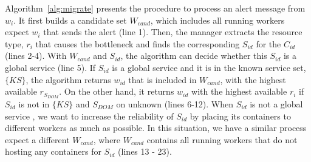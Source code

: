 Algorithm~\ref{alg:migrate} presents the procedure to process an alert message from $w_i$.
It first builds a candidate set $W_{cand}$, which includes all running workers expect $w_i$ that sends the alert (line 1).
Then, the manager extracts the resource type, $r_i$ that causes the bottleneck and finds the corresponding $S_{id}$ for the $C_{id}$ (lines 2-4).
With $W_{cand}$ and $S_{id}$, the algorithm can decide whether this $S_{id}$ is a global service (line 5). 
If $S_{id}$ is a global service and it is in the known service set, $\{KS\}$, the algorithm returns $w_{id}$ that is included in $W_{cand}$,
with the highest available $r_{S_{DOM}}$.
On the other hand, it returns $w_{id}$ with the highest available $r_i$ if $S_{id}$ is not in $\{KS\}$ and $S_{DOM}$ on unknown (lines 6-12).
When $S_{id}$ is not a global service , we want to increase the reliability of $S_{id}$ by placing its containers to different workers as much as possible.
In this situation, we have a similar process expect a different $W_{cand}$, where $W_{cand}$  contains all running
workers that do not hosting any containers for $S_{id}$ (lines 13 - 23).



